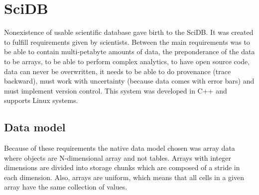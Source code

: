 


\section{SciDB}\label{scidb}
Nonexistence of usable scientific database gave birth to the SciDB. It was created to fulfill requirements given by scientists. Between the main requirements was to be able to contain multi-petabyte amounts of data, the preponderance of the data to be arrays, to be able to perform complex analytics, to have open source code, data can never be overwritten, it needs to be able to do provenance (trace backward), must work with uncertainty (because data comes with error bars) and must implement version control. This system was developed in C++ and supports Linux systems.

\subsection{Data model}

Because of these requirements the native data model chosen was array data where objects are N-dimensional array and not tables. Arrays with integer dimensions are divided into storage chunks which are composed of a stride in each dimension. Also, arrays are uniform, which means that all cells in a given array have the same collection of values. \cite{scidb}

